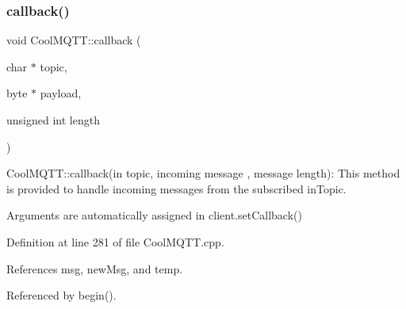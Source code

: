 \subsubsection{\texorpdfstring{callback()}{callback()}}
{\footnotesize\ttfamily void Cool\+M\+Q\+T\+T\+::callback (\begin{DoxyParamCaption}\item[{char $\ast$}]{topic,  }\item[{byte $\ast$}]{payload,  }\item[{unsigned int}]{length }\end{DoxyParamCaption})}

Cool\+M\+Q\+T\+T\+::callback(in topic, incoming message , message length)\+: This method is provided to handle incoming messages from the subscribed in\+Topic.

Arguments are automatically assigned in client.\+set\+Callback() 

Definition at line 281 of file Cool\+M\+Q\+T\+T.\+cpp.



References msg, new\+Msg, and temp.



Referenced by begin().



